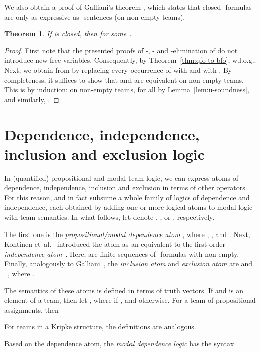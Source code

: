 \documentclass[a4paper,english,fleqn,11pt,final]{scrartcl}
\makeatletter
\newcommand{\wloss}{w.l.o.g.\@\xspace}
\theoremstyle{plain}
\newtheorem{theorem}{Theorem}[section]
\theoremstyle{definition}
\makeatother
\begin{document}
We also obtain a proof of Galliani's theorem \cite{Galliani14}, which states that closed -formulas are only as expressive as -sentences (on non-empty teams).


\begin{theorem}
If  is closed, then  for some .
\end{theorem}
\begin{proof}
First note that the presented proofs of -, - and -elimination of  do not introduce new free variables.
Consequently, by Theorem~\ref{thm:qfo-to-bfo}, \wloss .
Next, we obtain  from  by replacing every occurrence of  with  and  with .
By completeness, it suffices to show that  and  are equivalent on non-empty teams.
This is by induction: on non-empty teams,  for all  by Lemma~\ref{lem:u-soundness}, and similarly, .
\end{proof}
 
\section{Dependence, independence, inclusion and exclusion logic}\label{sec:fragments}

In (quantified) propositional and modal team logic, we can express atoms of dependence, independence, inclusion and exclusion in terms of other operators.
For this reason,  and  in fact subsume a whole family of logics of dependence and independence, each obtained by adding one or more logical atoms to modal logic with team semantics.
In what follows, let  denote , , or , respectively.


The first one is the \emph{propositional/modal dependence atom}  \cite{yang_propositional_2016,vaananen_modal_2008,emdl}, where , , and .
Next, Kontinen et~al.~\cite{mind} introduced the atom  as an equivalent to the first-order \emph{independence atom}~\cite{gradel2013dependence}.
Here,  are finite sequences of -formulas with  non-empty.
Finally, analogously to Galliani~\cite{galliani_inclusion_2012}, the \emph{inclusion atom} and \emph{exclusion atom} are  and ~\cite{HellaS15}, where .

\medskip

The semantics of these atoms is defined in terms of truth vectors.
If  and  is an element of a team, then let , where  if , and  otherwise.
For a team  of propositional assignments, then

For teams in a Kripke structure, the definitions are analogous.

\medskip

Based on the dependence atom, the \emph{modal dependence logic}  \cite{vaananen_modal_2008} has the syntax
\end{document}
